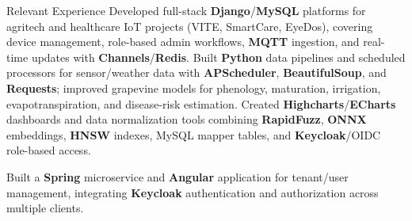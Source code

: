 \begin{rubric}{Relevant Experience}
\entry*%
 Developed full-stack \textbf{Django}/\textbf{MySQL} platforms for agritech and healthcare IoT projects (VITE, SmartCare, EyeDos), covering device management, role-based admin workflows, \textbf{MQTT} ingestion, and real-time updates with \textbf{Channels}/\textbf{Redis}.
\entry*%
 Built \textbf{Python} data pipelines and scheduled processors for sensor/weather data with \textbf{APScheduler}, \textbf{BeautifulSoup}, and \textbf{Requests}; improved grapevine models for phenology, maturation, irrigation, evapotranspiration, and disease-risk estimation.
\entry*%
 Created \textbf{Highcharts}/\textbf{ECharts} dashboards and data normalization tools combining \textbf{RapidFuzz}, \textbf{ONNX} embeddings, \textbf{HNSW} indexes, MySQL mapper tables, and \textbf{Keycloak}/OIDC role-based access.

%
\entry*%
 Built a \textbf{Spring} microservice and \textbf{Angular} application for tenant/user management, integrating \textbf{Keycloak} authentication and authorization across multiple clients.
%
\end{rubric}
